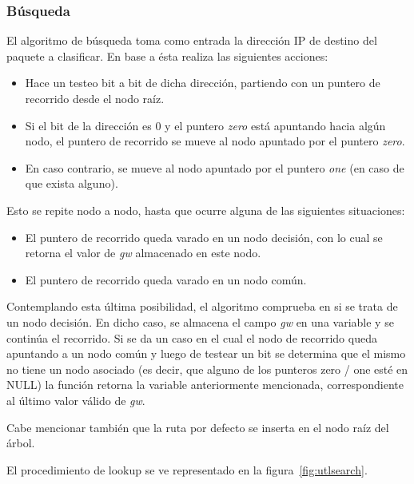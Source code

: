 \subsubsection{Búsqueda}

El algoritmo de búsqueda toma como entrada la dirección IP de destino del paquete a clasificar. En base a ésta realiza las siguientes acciones:
\begin{itemize}
	\item Hace un testeo bit a bit de dicha dirección, partiendo con un puntero de recorrido desde el nodo raíz.
	\item Si el bit de la dirección es 0 y el puntero \textit{zero} está apuntando hacia algún nodo, el puntero de recorrido se mueve al nodo apuntado por el puntero \textit{zero}.
	\item En caso contrario, se mueve al nodo apuntado por el puntero \textit{one} (en caso de que exista alguno).
\end{itemize}

Esto se repite nodo a nodo, hasta que ocurre alguna de las siguientes situaciones:

\begin{itemize}
    	\item El puntero de recorrido queda varado en un nodo decisión, con lo cual se retorna el valor de \textit{gw} almacenado en este nodo.
    	\item El puntero de recorrido queda varado en un nodo común. 
\end{itemize}


Contemplando esta última posibilidad, el algoritmo comprueba en si se trata de un nodo decisión. En dicho caso, se almacena el campo \textit{gw} en una variable y se continúa el recorrido. Si se da un caso en el cual el nodo de recorrido queda apuntando a un nodo común y luego de testear un bit se determina que el mismo no tiene un nodo asociado (es decir, que alguno de los punteros zero / one esté en NULL) la función retorna la variable anteriormente mencionada, correspondiente al último valor válido de \textit{gw}.

Cabe mencionar también que la ruta por defecto se inserta en el nodo raíz del árbol.

El procedimiento de lookup se ve representado en la figura~\ref{fig:utlsearch}.

